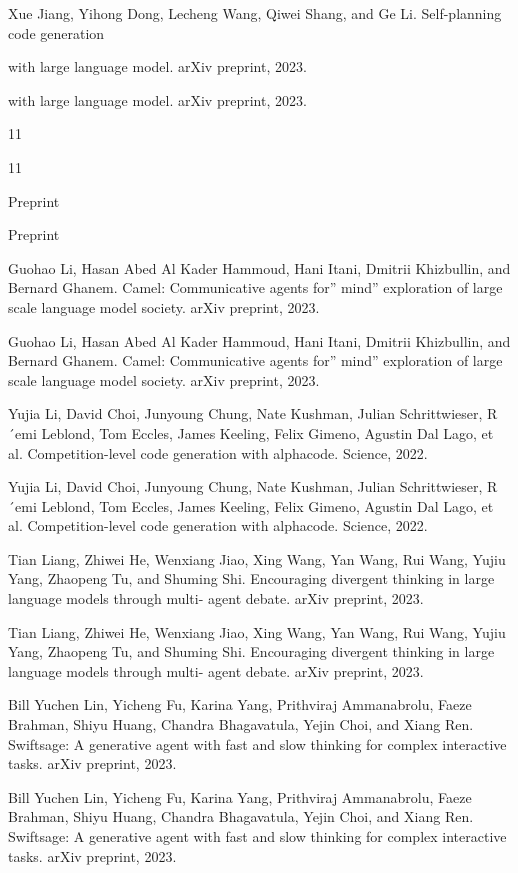\documentclass[12pt]{article}
\begin{document}
Xue Jiang, Yihong Dong, Lecheng Wang, Qiwei Shang, and Ge Li. Self-planning code generation


with large language model. arXiv preprint, 2023.


with large language model. arXiv preprint, 2023.


11


11


Preprint


Preprint


Guohao Li, Hasan Abed Al Kader Hammoud, Hani Itani, Dmitrii Khizbullin, and Bernard Ghanem.
Camel: Communicative agents for” mind” exploration of large scale language model society.
arXiv preprint, 2023.


Guohao Li, Hasan Abed Al Kader Hammoud, Hani Itani, Dmitrii Khizbullin, and Bernard Ghanem.
Camel: Communicative agents for” mind” exploration of large scale language model society.
arXiv preprint, 2023.


Yujia Li, David Choi, Junyoung Chung, Nate Kushman, Julian Schrittwieser, R´emi Leblond, Tom
Eccles, James Keeling, Felix Gimeno, Agustin Dal Lago, et al. Competition-level code generation
with alphacode. Science, 2022.


Yujia Li, David Choi, Junyoung Chung, Nate Kushman, Julian Schrittwieser, R´emi Leblond, Tom
Eccles, James Keeling, Felix Gimeno, Agustin Dal Lago, et al. Competition-level code generation
with alphacode. Science, 2022.


Tian Liang, Zhiwei He, Wenxiang Jiao, Xing Wang, Yan Wang, Rui Wang, Yujiu Yang, Zhaopeng
Tu, and Shuming Shi. Encouraging divergent thinking in large language models through multi-
agent debate. arXiv preprint, 2023.


Tian Liang, Zhiwei He, Wenxiang Jiao, Xing Wang, Yan Wang, Rui Wang, Yujiu Yang, Zhaopeng
Tu, and Shuming Shi. Encouraging divergent thinking in large language models through multi-
agent debate. arXiv preprint, 2023.


Bill Yuchen Lin, Yicheng Fu, Karina Yang, Prithviraj Ammanabrolu, Faeze Brahman, Shiyu Huang,
Chandra Bhagavatula, Yejin Choi, and Xiang Ren. Swiftsage: A generative agent with fast and
slow thinking for complex interactive tasks. arXiv preprint, 2023.


Bill Yuchen Lin, Yicheng Fu, Karina Yang, Prithviraj Ammanabrolu, Faeze Brahman, Shiyu Huang,
Chandra Bhagavatula, Yejin Choi, and Xiang Ren. Swiftsage: A generative agent with fast and
slow thinking for complex interactive tasks. arXiv preprint, 2023.
\end{document}
